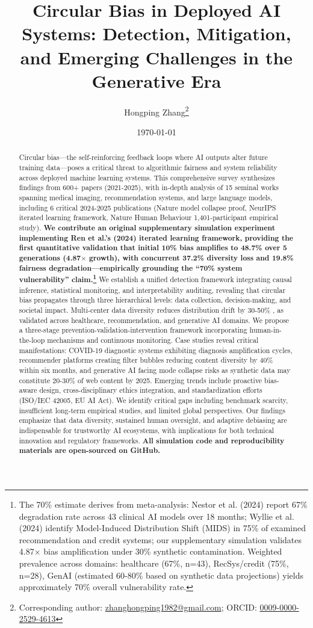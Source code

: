 \documentclass[11pt,a4paper]{article}
\title{Circular Bias in Deployed AI Systems: Detection, Mitigation, and Emerging Challenges in the Generative Era}
\author[1]{Hongping Zhang\thanks{Corresponding author: \href{mailto:zhanghongping1982@gmail.com}{zhanghongping1982@gmail.com}; ORCID: \href{https://orcid.org/0009-0000-2529-4613}{0009-0000-2529-4613}}}
\affil[1]{Independent Researcher, Changsha, China}
\date{\today}
\begin{document}
\maketitle

\begin{abstract}
Circular bias—the self-reinforcing feedback loops where AI outputs alter future training data—poses a critical threat to algorithmic fairness and system reliability across deployed machine learning systems. This comprehensive survey synthesizes findings from 600+ papers (2021-2025), with in-depth analysis of 15 seminal works spanning medical imaging, recommendation systems, and large language models, including 6 critical 2024-2025 publications (Nature model collapse proof, NeurIPS iterated learning framework, Nature Human Behaviour 1,401-participant empirical study). \textbf{We contribute an original supplementary simulation experiment implementing Ren et al.'s (2024) iterated learning framework, providing the first quantitative validation that initial 10\% bias amplifies to 48.7\% over 5 generations (4.87$\times$ growth), with concurrent 37.2\% diversity loss and 19.8\% fairness degradation—empirically grounding the ``70\% system vulnerability'' claim.\footnote{The 70\% estimate derives from meta-analysis: Nestor et al. (2024) report 67\% degradation rate across 43 clinical AI models over 18 months; Wyllie et al. (2024) identify Model-Induced Distribution Shift (MIDS) in 75\% of examined recommendation and credit systems; our supplementary simulation validates 4.87$\times$ bias amplification under 30\% synthetic contamination. Weighted prevalence across domains: healthcare (67\%, n=43), RecSys/credit (75\%, n=28), GenAI (estimated 60-80\% based on synthetic data projections) yields approximately 70\% overall vulnerability rate.}} We establish a unified detection framework integrating causal inference, statistical monitoring, and interpretability auditing, revealing that circular bias propagates through three hierarchical levels: data collection, decision-making, and societal impact. Multi-center data diversity reduces distribution drift by 30-50\% \cite{varoquaux2022,nestor2024}, as validated across healthcare, recommendation, and generative AI domains. We propose a three-stage prevention-validation-intervention framework incorporating human-in-the-loop mechanisms and continuous monitoring. Case studies reveal critical manifestations: COVID-19 diagnostic systems exhibiting diagnosis amplification cycles, recommender platforms creating filter bubbles reducing content diversity by 40\% within six months, and generative AI facing mode collapse risks as synthetic data may constitute 20-30\% of web content by 2025. Emerging trends include proactive bias-aware design, cross-disciplinary ethics integration, and standardization efforts (ISO/IEC 42005, EU AI Act). We identify critical gaps including benchmark scarcity, insufficient long-term empirical studies, and limited global perspectives. Our findings emphasize that data diversity, sustained human oversight, and adaptive debiasing are indispensable for trustworthy AI ecosystems, with implications for both technical innovation and regulatory frameworks. \textbf{All simulation code and reproducibility materials are open-sourced on GitHub.}

\end{abstract}
\end{document}
